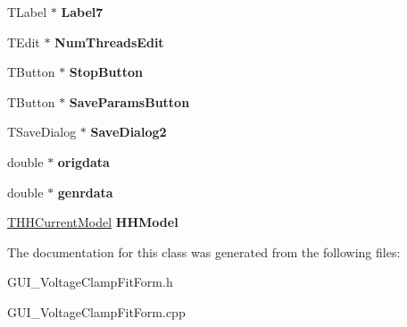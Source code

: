 \begin{DoxyCompactItemize}
\item 
\hypertarget{class_t_voltage_clamp_fit_form_a515df2eb85f70b5843c900620072613a}{T\+Label $\ast$ {\bfseries Label7}}\label{class_t_voltage_clamp_fit_form_a515df2eb85f70b5843c900620072613a}

\item 
\hypertarget{class_t_voltage_clamp_fit_form_a125a5c559f98754f46ad5bb92e8ae271}{T\+Edit $\ast$ {\bfseries Num\+Threads\+Edit}}\label{class_t_voltage_clamp_fit_form_a125a5c559f98754f46ad5bb92e8ae271}

\item 
\hypertarget{class_t_voltage_clamp_fit_form_aaa0297823e6098041e47ed4253555f21}{T\+Button $\ast$ {\bfseries Stop\+Button}}\label{class_t_voltage_clamp_fit_form_aaa0297823e6098041e47ed4253555f21}

\item 
\hypertarget{class_t_voltage_clamp_fit_form_a90346dff6142d6368b78fe7038a07af0}{T\+Button $\ast$ {\bfseries Save\+Params\+Button}}\label{class_t_voltage_clamp_fit_form_a90346dff6142d6368b78fe7038a07af0}

\item 
\hypertarget{class_t_voltage_clamp_fit_form_a828eed702082447383a34b54a9afcdff}{T\+Save\+Dialog $\ast$ {\bfseries Save\+Dialog2}}\label{class_t_voltage_clamp_fit_form_a828eed702082447383a34b54a9afcdff}

\item 
\hypertarget{class_t_voltage_clamp_fit_form_a67d5e0bf7cbde6f13ccd5984147c3bcf}{double $\ast$ {\bfseries origdata}}\label{class_t_voltage_clamp_fit_form_a67d5e0bf7cbde6f13ccd5984147c3bcf}

\item 
\hypertarget{class_t_voltage_clamp_fit_form_a109b2be4272d5b9aeca636c1b5fbb170}{double $\ast$ {\bfseries genrdata}}\label{class_t_voltage_clamp_fit_form_a109b2be4272d5b9aeca636c1b5fbb170}

\item 
\hypertarget{class_t_voltage_clamp_fit_form_ab029da795d12393380b3db9b5230e006}{\hyperlink{class_t_h_h_current_model}{T\+H\+H\+Current\+Model} {\bfseries H\+H\+Model}}\label{class_t_voltage_clamp_fit_form_ab029da795d12393380b3db9b5230e006}

\end{DoxyCompactItemize}


The documentation for this class was generated from the following files\+:\begin{DoxyCompactItemize}
\item 
G\+U\+I\+\_\+\+Voltage\+Clamp\+Fit\+Form.\+h\item 
G\+U\+I\+\_\+\+Voltage\+Clamp\+Fit\+Form.\+cpp\end{DoxyCompactItemize}
